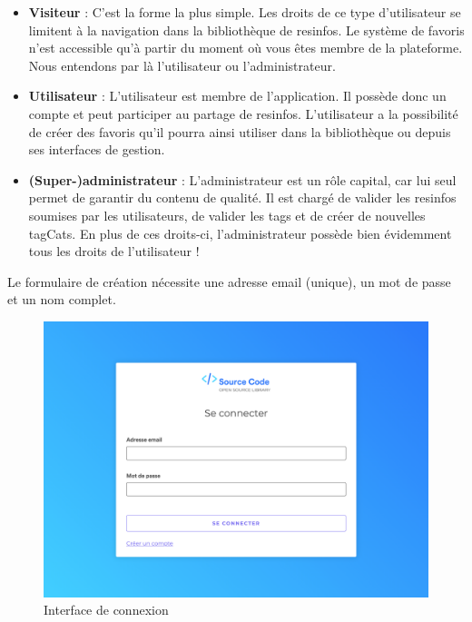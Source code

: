 \begin{itemize}
    \item \textbf{Visiteur} : C'est la forme la plus simple. Les droits de ce type d'utilisateur se limitent à la navigation dans la bibliothèque de \glspl{resinfo}. Le système de favoris n'est accessible qu'à partir du moment où vous êtes membre de la plateforme. Nous entendons par là l'utilisateur ou l'administrateur.
    \item \textbf{Utilisateur} : L'utilisateur est membre de l'application. Il possède donc un compte et peut participer au partage de \glspl{resinfo}. L'utilisateur a la possibilité de créer des favoris qu'il pourra ainsi utiliser dans la bibliothèque ou depuis ses interfaces de gestion.
    \item \textbf{(Super-)administrateur} : L'administrateur est un rôle capital, car lui seul permet de garantir du contenu de qualité. Il est chargé de valider les \glspl{resinfo} soumises par les utilisateurs, de valider les \glspl{tag} et de créer de nouvelles \glspl{tagCat}. En plus de ces droits-ci, l'administrateur possède bien évidemment tous les droits de l'utilisateur !
\end{itemize}

Le formulaire de création nécessite une adresse email (unique), un mot de passe et un nom complet.


\begin{figure}[H]
    \includegraphics[width=\textwidth,height=0.35\textheight,keepaspectratio]{images/client/login.png}
    \centering
    \caption[SourceCode : interface de connexion]{Interface de connexion}
\end{figure}

